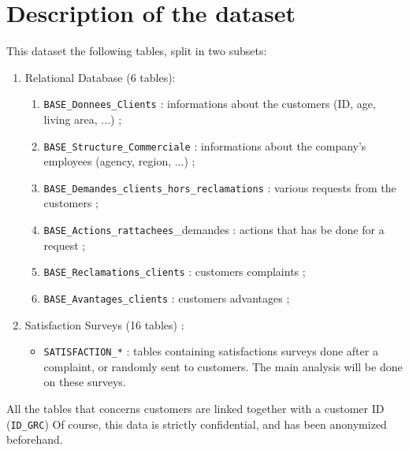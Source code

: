 \documentclass[a4paper, 11pt]{article}
\newcommand{\tw}[1]{\texttt{#1}}
\begin{document}
\section{Description of the dataset} %
	This dataset the following tables, split in two subsets:
    \begin{enumerate}
    	\item Relational Database (6 tables):
    	\begin{enumerate}
            \item \tw{BASE\_Donnees\_Clients} : informations about the customers (ID, age, living area, ...) ;
            \item \tw{BASE\_Structure\_Commerciale} : informations about the company's employees (agency, region, ...) ;
            \item \tw{BASE\_Demandes\_clients\_hors\_reclamations} : various requests from the customers ;
            \item \tw{BASE\_Actions\_rattachees}\_demandes : actions that has be done for a request ;
            \item \tw{BASE\_Reclamations\_clients} : customers complaints ;
            \item \tw{BASE\_Avantages\_clients} : customers advantages ;
        \end{enumerate}
        \item Satisfaction Surveys (16 tables) :
        \begin{itemize}
        	\item \tw{SATISFACTION\_*} : tables containing satisfactions surveys done after a complaint, or randomly sent to customers. The main analysis will be done on these surveys.
        \end{itemize}
	\end{enumerate}
    All the tables that concerns customers are linked together with a customer ID (\tw{ID\_GRC})
    Of course, this data is strictly confidential, and has been anonymized beforehand. 
    
    
\end{document}
